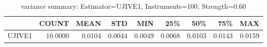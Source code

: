 \begin{table}[ht]
\centering
\caption{variance summary: Estimator=UJIVE1, Instruments=100, Strength=0.60}
\begin{tabular}{lrrrrrrrr}
\toprule
 & COUNT & MEAN & STD & MIN & 25\% & 50\% & 75\% & MAX \\
\midrule
UJIVE1 & 10.0000 & 0.0104 & 0.0044 & 0.0049 & 0.0068 & 0.0103 & 0.0143 & 0.0159 \\
\bottomrule
\end{tabular}
\end{table}
